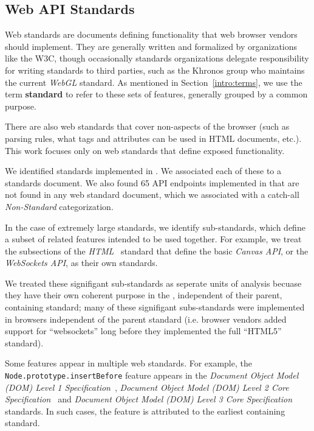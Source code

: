 \subsection{Web API Standards}
\label{measurement:data-sources:method-web-standards}
Web standards are documents defining functionality that web browser vendors
should implement.  They are generally written and formalized by organizations
like the W3C, though occasionally standards organizations delegate
responsibility for writing standards to third parties, such as the Khronos
group who maintains the current \textit{WebGL} standard.  As mentioned in
Section~\ref{intro:terms}, we use the term \textbf{standard} to refer to these
sets of features, generally grouped by a common purpose.

There are also web standards that cover non-\JS aspects of the browser (such
as parsing rules, what tags and attributes can be used in HTML documents,
etc.). This work focuses only on web standards that define \JS exposed
functionality.

We identified \numstandards standards implemented in \FF.  We associated each
of these to a standards document.  We also found 65 API endpoints implemented
in \FF that are not found in any web standard document, which we associated
with a catch-all \textit{Non-Standard} categorization.

In the case of extremely large standards, we identify sub-standards, which
define a subset of related features intended to be used together.  For example,
we treat the subsections of the \textit{HTML}~\cite{whatwg2018html} standard
that define the basic \textit{Canvas API}, or the \textit{WebSockets API}, as
their own standards.

We treated these signifigant sub-standards as seperate units of analysis
becuase they have their own coherent purpose in the \WAPI, independent
of their parent, containing standard; many of these signifigant subs-standards
were implemented in browsers independent of the parent standard (i.e. browser
vendors added support for ``websockets'' long before they implemented the full
``HTML5'' standard).

Some features appear in multiple web standards.  For example, the
\texttt{Node.prototype.insertBefore} feature appears in the \textit{Document
Object Model (DOM) Level 1 Specification}~\cite{dom1w3c}, \textit{Document
Object Model (DOM) Level 2 Core Specification}~\cite{dom2corew3c} and
\emph{Document Object Model (DOM) Level 3 Core
Specification}~\cite{dom3corew3c} standards.  In such cases, the feature is
attributed to the earliest containing standard.


